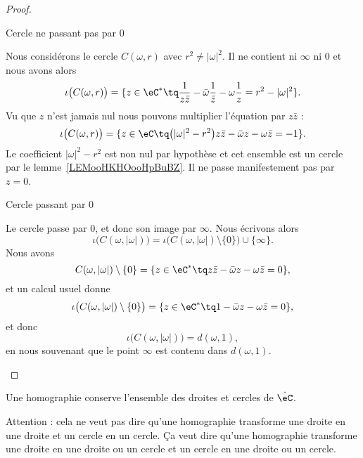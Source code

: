 \begin{proof}
\begin{subproof}
		\item[Cercle ne passant pas par \( 0\)]


		Nous considérons le cercle \( C(\omega,r)\) avec \( r^2\neq | \omega |^2\). Il ne contient ni \( \infty\) ni \( 0\) et nous avons alors
		\begin{equation}
			\iota\big( C(\omega,r) \big)=\{ z\in \eC^*\tq \frac{1}{ z\bar z }-\bar\omega\frac{1}{ \bar z }-\omega\frac{1}{ z }=r^2-| \omega |^2 \}.
		\end{equation}
		Vu que \( z\) n'est jamais nul nous pouvons multiplier l'équation par \( z\bar z\) :
		\begin{equation}
			\iota\big( C(\omega,r) \big)=\{ z\in \eC\tq \big( | \omega |^2-r^2 \big)z\bar z-\bar\omega z-\omega\bar z=-1 \}.
		\end{equation}
		Le coefficient \( | \omega |^2-r^2\) est non nul par hypothèse et cet ensemble est un cercle par le lemme~\ref{LEMooHKHOooHpBuBZ}. Il ne passe manifestement pas par \( z=0\).


		\item[Cercle passant par \( 0\)]

		Le cercle passe par \( 0\), et donc son image par \( \infty\). Nous écrivons alors
		\begin{equation}
			\iota\big( C(\omega,| \omega |) \big)=\iota\big( C(\omega,| \omega |)\setminus\{ 0 \} \big)\cup\{ \infty \}.
		\end{equation}
		Nous avons
		\begin{equation}
			C(\omega,| \omega |)\setminus \{ 0 \} =\{ z\in \eC^*\tq z\bar z-\bar \omega z-\omega\bar z=0 \},
		\end{equation}
		et un calcul usuel donne
		\begin{equation}
			\iota\big( C(\omega,| \omega |)\setminus \{ 0 \}  \big)=\{ z\in \eC^*\tq 1-\bar \omega z-\omega\bar z=0 \},
		\end{equation}
		et donc
		\begin{equation}
			\iota\big( C(\omega,| \omega |) \big)=d(\omega,1),
		\end{equation}
		en nous souvenant que le point \( \infty\) est contenu dans \( d(\omega,1)\).

	\end{subproof}
\end{proof}

\begin{proposition}     \label{PROPooYFJBooAWxFIs}
	Une homographie conserve l'ensemble des droites et cercles de \( \hat\eC\).
\end{proposition}
Attention : cela ne veut pas dire qu'une homographie transforme une droite en une droite et un cercle en un cercle. Ça veut dire qu'une homographie transforme une droite en une droite ou un cercle et un cercle en une droite ou un cercle.

